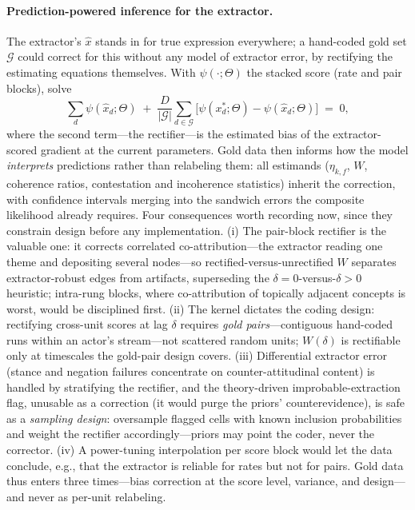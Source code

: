 \documentclass[11pt]{article}
\newcommand{\1}{\mathbb{1}}
\begin{document}
\paragraph{Prediction-powered inference for the extractor.} The extractor's $\hat x$ stands in for true expression everywhere; a hand-coded gold set $\mathcal{G}$ could correct for this without any model of extractor error, by rectifying the estimating equations themselves. With $\psi(\cdot;\Theta)$ the stacked score (rate and pair blocks), solve
\[
  \sum_d \psi(\hat x_d;\Theta)\;+\;\frac{D}{|\mathcal{G}|}\sum_{d\in\mathcal{G}}\big[\psi(x^*_d;\Theta)-\psi(\hat x_d;\Theta)\big]\;=\;0,
\]
where the second term---the rectifier---is the estimated bias of the extractor-scored gradient at the current parameters. Gold data then informs how the model \emph{interprets} predictions rather than relabeling them: all estimands ($\eta_{k,f}$, $W$, coherence ratios, contestation and incoherence statistics) inherit the correction, with confidence intervals merging into the sandwich errors the composite likelihood already requires. Four consequences worth recording now, since they constrain design before any implementation. (i) The pair-block rectifier is the valuable one: it corrects correlated co-attribution---the extractor reading one theme and depositing several nodes---so rectified-versus-unrectified $W$ separates extractor-robust edges from artifacts, superseding the $\delta{=}0$-versus-$\delta{>}0$ heuristic; intra-rung blocks, where co-attribution of topically adjacent concepts is worst, would be disciplined first. (ii) The kernel dictates the coding design: rectifying cross-unit scores at lag $\delta$ requires \emph{gold pairs}---contiguous hand-coded runs within an actor's stream---not scattered random units; $W(\delta)$ is rectifiable only at timescales the gold-pair design covers. (iii) Differential extractor error (stance and negation failures concentrate on counter-attitudinal content) is handled by stratifying the rectifier, and the theory-driven improbable-extraction flag, unusable as a correction (it would purge the priors' counterevidence), is safe as a \emph{sampling design}: oversample flagged cells with known inclusion probabilities and weight the rectifier accordingly---priors may point the coder, never the corrector. (iv) A power-tuning interpolation per score block would let the data conclude, e.g., that the extractor is reliable for rates but not for pairs. Gold data thus enters three times---bias correction at the score level, variance, and design---and never as per-unit relabeling.
\end{document}
